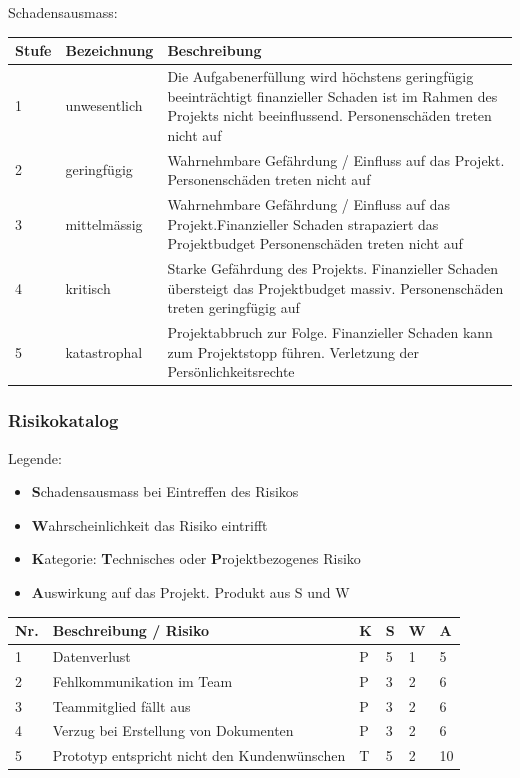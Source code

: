 \documentclass[a4paper]{scrreprt}
\begin{document}
\vspace{1em}
\noindent
Schadensausmass:

\vspace{1em}
\noindent
\begin{tabular}{|p{}|p{}|p{}|}
	\hline
	\textbf{Stufe} & \textbf{Bezeichnung} & \textbf{Beschreibung} \\
	\hline
	1 & unwesentlich & Die Aufgabenerfüllung wird höchstens geringfügig beeinträchtigt finanzieller Schaden ist im Rahmen des Projekts nicht beeinflussend. Personenschäden treten nicht auf \\
	\hline
	2 & geringfügig & Wahrnehmbare Gefährdung / Einfluss auf das Projekt. Personenschäden treten nicht auf \\
	\hline
	3 & mittelmässig & Wahrnehmbare Gefährdung / Einfluss auf das Projekt.Finanzieller Schaden strapaziert das Projektbudget
	Personenschäden treten nicht auf \\
	\hline
	4 & kritisch & Starke Gefährdung des Projekts. Finanzieller Schaden übersteigt das Projektbudget massiv. Personenschäden treten geringfügig auf \\
	\hline
	5 & katastrophal & Projektabbruch zur Folge. Finanzieller Schaden kann zum Projektstopp führen. Verletzung der Persönlichkeitsrechte
	\\
	\hline
\end{tabular}

\subsubsection{Risikokatalog}
\label{sssec:Risikokatalog}
Legende:
\begin{itemize}
	\item \textbf{S}chadensausmass bei Eintreffen des Risikos
	\item \textbf{W}ahrscheinlichkeit das Risiko eintrifft
	\item \textbf{K}ategorie: \textbf{T}echnisches oder \textbf{P}rojektbezogenes Risiko
	\item \textbf{A}uswirkung auf das Projekt. Produkt aus S und W
\end{itemize}

\vspace{1em}
\noindent
\begin{tabular}{|p{}|p{}|p{}|p{}|p{}||p{}|}
	\hline
	\textbf{Nr.} & \textbf{Beschreibung / Risiko} & \textbf{K} & \textbf{S} & \textbf{W} & \textbf{A} \\
	\hline
	1 & Datenverlust & P & 5 & 1 & 5\\
	\hline
	2 & Fehlkommunikation im Team & P & 3 & 2 & 6 \\
	\hline
	3 & Teammitglied fällt aus & P & 3 & 2 & 6 \\
	\hline
	4 & Verzug bei Erstellung von Dokumenten & P & 3 & 2 & 6 \\
	\hline
	5 & Prototyp entspricht nicht den Kundenwünschen & T & 5 & 2 & 10 \\
	\hline
\end{tabular}
\end{document}
